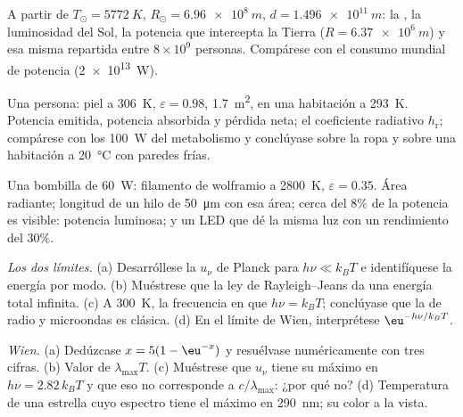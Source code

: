 \begin{exercise}[$\star$]\label{exo:b2:thermal-radiation:2}
A partir de $T_\odot = \qty{5772}{K}$, $R_\odot = \qty{6.96e8}{m}$, $d = \qty{1.496e11}{m}$:
la , la luminosidad del Sol, la potencia que intercepta la
Tierra ($R = \qty{6.37e6}{m}$) y esa misma repartida entre $8 \times 10^9$
personas. Compárese con el consumo mundial de potencia (\qty{2e13}{W}).
\end{exercise}

\begin{exercise}[$\star$]\label{exo:b2:thermal-radiation:3}
Una persona: piel a \qty{306}{K}, $\varepsilon = 0.98$, \qty{1.7}{m^2}, en una
habitación a \qty{293}{K}. Potencia emitida, potencia absorbida y pérdida neta; el
coeficiente radiativo $h_{\text{r}}$; compárese con los \qty{100}{W} del
metabolismo y conclúyase sobre la ropa y sobre una habitación a \qty{20}{\celsius}
con paredes frías.
\end{exercise}

\begin{exercise}[$\star$]\label{exo:b2:thermal-radiation:4}
Una bombilla de \qty{60}{W}: filamento de wolframio a \qty{2800}{K}, $\varepsilon = 0.35$.
Área radiante; longitud de un hilo de \qty{50}{\micro m} con esa área;
cerca del $8\%$ de la potencia es visible: potencia luminosa; y un LED que dé
la misma luz con un rendimiento del $30\%$.
\end{exercise}

\begin{exercise}[$\star\star$]\label{exo:b2:thermal-radiation:5}
\emph{Los dos límites.} (a) Desarróllese la $u_\nu$ de Planck para $h\nu \ll k_BT$ e
identifíquese la energía por modo. (b) Muéstrese que la ley de Rayleigh--Jeans
da una energía total infinita. (c) A \qty{300}{K}, la frecuencia en que
$h\nu = k_BT$; conclúyase que la  de radio y microondas es
clásica. (d) En el límite de Wien, interprétese $\eu^{-h\nu/k_BT}$.
\end{exercise}

\begin{exercise}[$\star\star$]\label{exo:b2:thermal-radiation:6}
\emph{Wien.} (a) Dedúzcase $x = 5(1 - \eu^{-x})$ y resuélvase numéricamente
con tres cifras. (b) Valor de $\lambda_{\max}T$. (c) Muéstrese que $u_\nu$
tiene su máximo en $h\nu = 2.82\,k_BT$ y que eso no corresponde a
$c/\lambda_{\max}$: ¿por qué no? (d) Temperatura de una estrella cuyo espectro
tiene el máximo en \qty{290}{nm}; su color a la vista.
\end{exercise}

